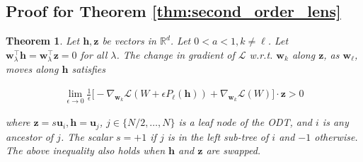 \documentclass{article}
\theoremstyle{plain}
\newtheorem*{theorem*}{Theorem}
\theoremstyle{definition}
\theoremstyle{remark}
\newcommand{\R}{{\mathbb R}}
\newcommand{\1}{{\mathbf 1}}
\newcommand{\0}{{\mathbf 0}}
\newcommand{\h}{{\mathbf h}}
\newcommand{\z}{{\mathbf z}}
\newcommand{\w}{{\mathbf w}}
\newcommand{\bu}{{\mathbf u}}
\renewcommand{\>}{{\rightarrow}}
\begin{document}
\subsection{Proof for Theorem \ref{thm:second_order_lens}}
\begin{theorem*}
Let $\h, \z$ be vectors in $\R^d$. Let $0<a<1, k\neq \ell$. Let $\w_\lambda^\top \h = \w_\lambda^\top \z = 0$ for all $\lambda$. The change in gradient of $\mathcal{L}$ w.r.t. $\w_k$ along $\z$,   as $\w_\ell$, moves along $\h$ satisfies

\begin{align*}
\lim_{\epsilon \to 0} \frac{1}{\epsilon} \bigg[ 
 -\nabla_{\w_k} \mathcal{L}(W + \epsilon P_\ell(\h))  
 + \nabla_{\w_k} \mathcal{L}(W)  \bigg]\cdot \z > 0
\end{align*}

where $\z= s \bu_i, \h = \bu_j$,  $j\in\{N/2,\ldots,N\}$ is a leaf node of the ODT, and $i$ is any ancestor of $j$. The scalar $s=+1$ if $j$ is in the left sub-tree of $i$ and $-1$ otherwise. The above inequality also holds when $\h$ and $\z$ are swapped.
\end{theorem*}
\end{document}
